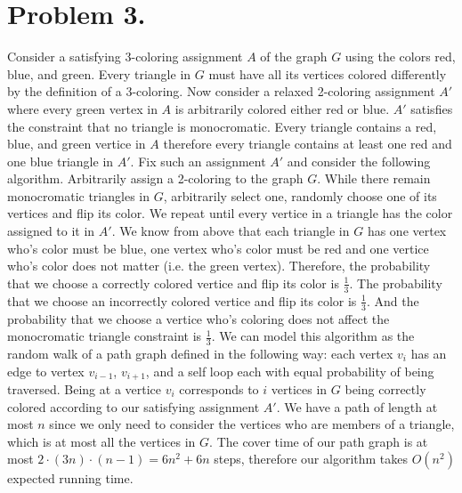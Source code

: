 \documentclass[12pt]{article}
\begin{document}
\pagestyle{plain}
\titleformat{\subsection}[runin]
  {\normalfont\large\bfseries}{\thesubsection}{1em}{}
\titleformat{\subsubsection}[runin]
  {\normalfont\large\bfseries}{\thesubsubsection}{1em}{}

\section*{Problem 3.}
Consider a satisfying 3-coloring assignment $A$ of the graph $G$ using the
colors red, blue, and green. Every triangle in $G$ must have all its vertices
colored differently by the definition of a 3-coloring. Now consider a relaxed
2-coloring assignment $A'$ where every green vertex in $A$ is arbitrarily
colored either red or blue. $A'$ satisfies the constraint that no triangle is
monocromatic. Every triangle contains a red, blue, and green vertice in $A$
therefore every triangle contains at least one red and one blue triangle in $A'$.
Fix such an assignment $A'$ and consider the following algorithm. Arbitrarily
assign a 2-coloring to the graph $G$. While there remain monocromatic triangles
in $G$, arbitrarily select one, randomly choose one of
its vertices and flip its color. We repeat until every vertice in a triangle has
the color assigned to it in $A'$. We know from above that each triangle in $G$
has one vertex who's color must be blue, one vertex who's color must be red and
one vertice who's color does not matter (i.e. the green vertex). Therefore, the
probability that we choose a correctly colored vertice and flip its color is
$\frac{1}{3}$. The probability that we choose an incorrectly colored vertice and
flip its color is $\frac{1}{3}$. And the probability that we choose a vertice
who's coloring does not affect the monocromatic triangle constraint is $\frac{1}{3}$.
We can model this algorithm as the random walk of a path graph defined in the
following way: each vertex $v_i$ has an edge to vertex $v_{i-1}$, $v_{i+1}$,
and a self loop each with equal probability of being traversed. Being at a
vertice $v_i$ corresponds to $i$ vertices in $G$ being correctly colored
according to our satisfying assignment $A'$. We have a path of length at most
$n$ since we only need to consider the vertices who are members of a triangle,
which is at most all the vertices in $G$. The cover time of our path graph is at
most $2\cdot(3n)\cdot(n-1) = 6n^2+6n$ steps, therefore our algorithm takes
$O(n^2)$ expected running time.
\end{document}
